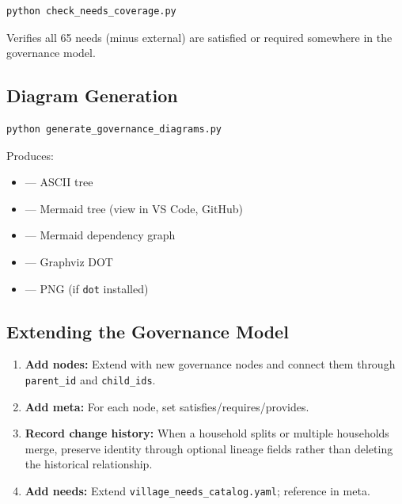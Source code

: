 \documentclass[11pt,a4paper]{article}
\begin{document}
\begin{verbatim}
python check_needs_coverage.py
\end{verbatim}

Verifies all 65 needs (minus external) are satisfied or required somewhere in the governance model.

\subsection{Diagram Generation}

\begin{verbatim}
python generate_governance_diagrams.py
\end{verbatim}

Produces:
\begin{itemize}
    \item {} --- ASCII tree
    \item {} --- Mermaid tree (view in VS Code, GitHub)
    \item {} --- Mermaid dependency graph
    \item {} --- Graphviz DOT
    \item {} --- PNG (if \texttt{dot} installed)
\end{itemize}

\subsection{Extending the Governance Model}

\begin{enumerate}
    \item \textbf{Add nodes:} Extend  with new governance nodes and connect them through \texttt{parent\_id} and \texttt{child\_ids}.
    \item \textbf{Add meta:} For each node, set satisfies/requires/provides.
    \item \textbf{Record change history:} When a household splits or multiple households merge, preserve identity through optional lineage fields rather than deleting the historical relationship.
    \item \textbf{Add needs:} Extend \texttt{village\_needs\_catalog.yaml}; reference in meta.
\end{enumerate}
\end{document}
